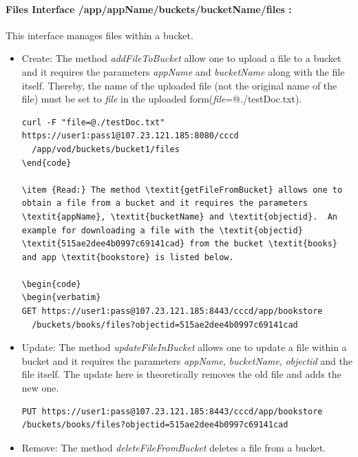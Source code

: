 \paragraph{Files Interface /app/{appName}/buckets/{bucketName}/files :}  This interface manages files within a bucket.

\begin{itemize}
\item {Create:} The method \textit{addFileToBucket} allow one to upload a file to a bucket and it requires the parameters \textit{appName} and \textit{bucketName} along with the file itself. Thereby, the name of the uploaded file (not the original name of the file) must be set to \textit{file} in the uploaded form(\textit{file}=@./testDoc.txt). 

\begin{code}
\begin{verbatim}
curl -F "file=@./testDoc.txt" https://user1:pass1@107.23.121.185:8080/cccd
  /app/vod/buckets/bucket1/files
\end{code}

\item {Read:} The method \textit{getFileFromBucket} allows one to obtain a file from a bucket and it requires the parameters \textit{appName}, \textit{bucketName} and \textit{objectid}.  An example for downloading a file with the \textit{objectid}  \textit{515ae2dee4b0997c69141cad} from the bucket \textit{books} and app \textit{bookstore} is listed below.

\begin{code}
\begin{verbatim}
GET https://user1:pass@107.23.121.185:8443/cccd/app/bookstore
  /buckets/books/files?objectid=515ae2dee4b0997c69141cad
\end{verbatim}
\end{code}

\item {Update:} The method \textit{updateFileInBucket} allows one to update a file within a bucket and it requires the parameters \textit{appName}, \textit{bucketName}, \textit{objectid} and the file itself.  The update here is theoretically removes the old file and  adds the new one.
\begin{code}
\begin{verbatim}
PUT https://user1:pass@107.23.121.185:8443/cccd/app/bookstore
/buckets/books/files?objectid=515ae2dee4b0997c69141cad
\end{verbatim}
\end{code}

\item {Remove:} The method \textit{deleteFileFromBucket} deletes a file from a bucket.

\end{itemize}

